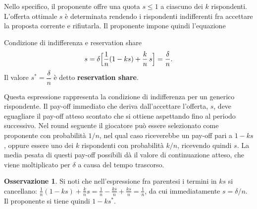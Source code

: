 \documentclass[12pt,a4paper,twoside]{book}
\theoremstyle{plain}
\theoremstyle{definition}
\newtheorem{remark}[theorem]{Osservazione}
\begin{document}
Nello specifico, il proponente offre una quota $s\le1$ a ciascuno dei $k$ rispondenti.
L'offerta ottimale $s$ è determinata rendendo i rispondenti indifferenti fra accettare la
proposta corrente e rifiutarla. Il proponente impone quindi l'equazione

\begin{thmbox}{Condizione di indifferenza e reservation share}
\[
  s=\delta\Bigl[\frac{1}{n}(1-ks)+\frac{k}{n}\,s\Bigr]=\frac{\delta}{n}.
\]
Il valore $s^*=\dfrac{\delta}{n}$ è detto \textbf{reservation share}.
\end{thmbox}

Questa espressione rappresenta la condizione di indifferenza per un generico rispondente. Il
pay-off immediato che deriva dall'accettare l'offerta, $s$, deve eguagliare il pay-off atteso
scontato che si ottiene aspettando fino al periodo successivo. Nel round seguente il giocatore
può essere selezionato come proponente con probabilità $1/n$, nel qual caso riceverebbe un
pay-off pari a $1-ks$, oppure essere uno dei $k$ rispondenti con probabilità $k/n$, ricevendo
quindi $s$. La media pesata di questi pay-off possibili dà il valore di continuazione atteso,
che viene moltiplicato per $\delta$ a causa del tempo trascorso.

\begin{remark}
Si noti che nell'espressione fra parentesi i termini in $ks$ si cancellano:
$\frac1n(1-ks)+\frac kn s=\frac1n-\frac{ks}{n}+\frac{ks}{n}=\frac1n$, da cui immediatamente
$s=\delta/n$. Il proponente si tiene quindi $1-ks^*$.
\end{remark}
\end{document}
